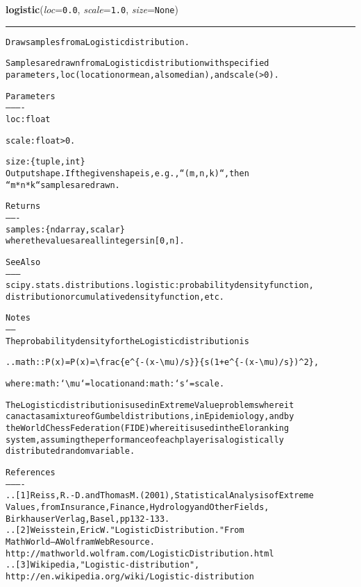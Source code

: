 \hspace{.8\funcindent}\begin{boxedminipage}{\funcwidth}

    \raggedright \textbf{logistic}(\textit{loc}={\tt 0.0}, \textit{scale}={\tt 1.0}, \textit{size}={\tt None})

    \vspace{-1.5ex}

    \rule{\textwidth}{0.5\fboxrule}
\setlength{\parskip}{2ex}
\begin{alltt}
Draw samples from a Logistic distribution.

Samples are drawn from a Logistic distribution with specified
parameters, loc (location or mean, also median), and scale ({\textgreater}0).

Parameters
----------
loc : float

scale : float {\textgreater} 0.

size : \{tuple, int\}
    Output shape.  If the given shape is, e.g., ``(m, n, k)``, then
    ``m * n * k`` samples are drawn.

Returns
-------
samples : \{ndarray, scalar\}
          where the values are all integers in  [0, n].

See Also
--------
scipy.stats.distributions.logistic : probability density function,
    distribution or cumulative density function, etc.

Notes
-----
The probability density for the Logistic distribution is

.. math:: P(x) = P(x) = {\textbackslash}frac\{e{\textasciicircum}\{-(x-{\textbackslash}mu)/s\}\}\{s(1+e{\textasciicircum}\{-(x-{\textbackslash}mu)/s\}){\textasciicircum}2\},

where :math:`{\textbackslash}mu` = location and :math:`s` = scale.

The Logistic distribution is used in Extreme Value problems where it
can act as a mixture of Gumbel distributions, in Epidemiology, and by
the World Chess Federation (FIDE) where it is used in the Elo ranking
system, assuming the performance of each player is a logistically
distributed random variable.

References
----------
.. [1] Reiss, R.-D. and Thomas M. (2001), Statistical Analysis of Extreme
       Values, from Insurance, Finance, Hydrology and Other Fields,
       Birkhauser Verlag, Basel, pp 132-133.
.. [2] Weisstein, Eric W. "Logistic Distribution." From
       MathWorld--A Wolfram Web Resource.
       http://mathworld.wolfram.com/LogisticDistribution.html
.. [3] Wikipedia, "Logistic-distribution",
       http://en.wikipedia.org/wiki/Logistic-distribution


\end{alltt}
\end{boxedminipage}
